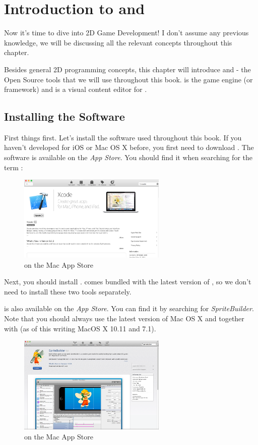 \chapter{Introduction to \SB{} and \cocos{} }
Now it's time to dive into 2D Game Development! I don't assume any previous
knowledge, we will be discussing all the relevant concepts throughout this
chapter.

Besides general 2D programming concepts, this chapter will introduce \SB{}
and \cocos{} - the Open Source tools that we will use throughout this book. 
\cocos{} is the game engine (or framework) and \SB{} is a visual content editor
for \cocos{}.

\section{Installing the Software}
First things first. Let's install the software used throughout this book. If you
haven't developed for iOS or Mac OS X before, you first need to download
\xcode{}. The software is available on the \textit{App Store}. You should find
it when searching for the term \textit{\xcode{}}:

\begin{figure}[H] 
    \centering
    \includegraphics[width=200pt]{images/Chapter2/install_xcode.png}     
    \caption{\xcode{} on the Mac App Store}
\end{figure}

Next, you should install \SB{}. \SB{} comes bundled with the latest version of
\cocos{}, so we don't need to install these two tools separately.

\SB{} is also available on the \textit{App Store}. You can find it by searching
for \textit{SpriteBuilder}. Note that you should always use the latest version of
 Mac OS X and \xcode{} together with \SB{} (as of this writing MacOS X 10.11 and
 \xcode{} 7.1).

\begin{figure}[H] 
		\centering
		\includegraphics[width=200pt]{images/cocos2d/setup/mac_appstore_install.png}     
		\caption{\SB{} on the Mac App Store}
\end{figure}

